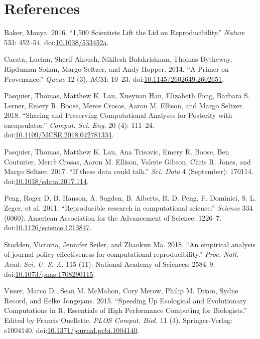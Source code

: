 \documentclass[]{article}
\begin{document}
\section*{References}\label{references}

\hypertarget{refs}{}
\hypertarget{ref-Baker2016}{}
Baker, Monya. 2016. ``1,500 Scientists Lift the Lid on
Reproducibility.'' \emph{Nature} 533: 452--54.
doi:\href{https://doi.org/10.1038/533452a}{10.1038/533452a}.

\hypertarget{ref-Carata2014}{}
Carata, Lucian, Sherif Akoush, Nikilesh Balakrishnan, Thomas Bytheway,
Ripduman Sohan, Margo Seltzer, and Andy Hopper. 2014. ``A Primer on
Provenance.'' \emph{Queue} 12 (3). ACM: 10--23.
doi:\href{https://doi.org/10.1145/2602649.2602651}{10.1145/2602649.2602651}.

\hypertarget{ref-Pasquier2018}{}
Pasquier, Thomas, Matthew K. Lau, Xueyuan Han, Elizabeth Fong, Barbara
S. Lerner, Emery R. Boose, Merce Crosas, Aaron M. Ellison, and Margo
Seltzer. 2018. ``Sharing and Preserving Computational Analyses for
Posterity with encapsulator.'' \emph{Comput. Sci. Eng.} 20 (4): 111--24.
doi:\href{https://doi.org/10.1109/MCSE.2018.042781334}{10.1109/MCSE.2018.042781334}.

\hypertarget{ref-Pasquier2017}{}
Pasquier, Thomas, Matthew K. Lau, Ana Trisovic, Emery R. Boose, Ben
Couturier, Mercè Crosas, Aaron M. Ellison, Valerie Gibson, Chris R.
Jones, and Margo Seltzer. 2017. ``If these data could talk.'' \emph{Sci.
Data} 4 (September): 170114.
doi:\href{https://doi.org/10.1038/sdata.2017.114}{10.1038/sdata.2017.114}.

\hypertarget{ref-Peng2011}{}
Peng, Roger D, B. Hanson, A. Sugden, B. Alberts, R. D. Peng, F.
Dominici, S. L. Zeger, et al. 2011. ``Reproducible research in
computational science.'' \emph{Science} 334 (6060). American Association
for the Advancement of Science: 1226--7.
doi:\href{https://doi.org/10.1126/science.1213847}{10.1126/science.1213847}.

\hypertarget{ref-Stodden2018}{}
Stodden, Victoria, Jennifer Seiler, and Zhaokun Ma. 2018. ``An empirical
analysis of journal policy effectiveness for computational
reproducibility.'' \emph{Proc. Natl. Acad. Sci. U. S. A.} 115 (11).
National Academy of Sciences: 2584--9.
doi:\href{https://doi.org/10.1073/pnas.1708290115}{10.1073/pnas.1708290115}.

\hypertarget{ref-Visser2015}{}
Visser, Marco D., Sean M. McMahon, Cory Merow, Philip M. Dixon, Sydne
Record, and Eelke Jongejans. 2015. ``Speeding Up Ecological and
Evolutionary Computations in R; Essentials of High Performance Computing
for Biologists.'' Edited by Francis Ouellette. \emph{PLOS Comput. Biol.}
11 (3). Springer-Verlag: e1004140.
doi:\href{https://doi.org/10.1371/journal.pcbi.1004140}{10.1371/journal.pcbi.1004140}.
\end{document}
